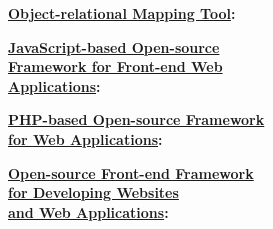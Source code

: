 \divider

\hspace{1em}\textbf{\faSitemap\hspace{0.5em}\underline{Object-relational Mapping Tool}:}\\

\vspace{1mm} %

\hspace{3em}

\divider

\hspace{1em}\textbf{\faGlobe\hspace{0.5em}\underline{JavaScript-based Open-source} \\\hspace{2.1em} \underline{Framework for Front-end Web} \\\hspace{2.3em}\underline{Applications}:}\\

\vspace{1mm} %

\hspace{3em}
\hspace{3em}

\divider

\vspace{1mm} %

\hspace{1em}\textbf{\faGlobe\hspace{0.5em}\underline{PHP-based Open-source Framework} \\\hspace{2.1em} \underline{for Web Applications}:}\\

\vspace{1mm} %

\hspace{3em}

\divider

\hspace{1em}\textbf{\faGlobe\hspace{0.5em}\underline{Open-source Front-end Framework} \\\hspace{2.1em} \underline{for Developing Websites} \\\hspace{2.1em} \underline{and Web Applications}:}\\

